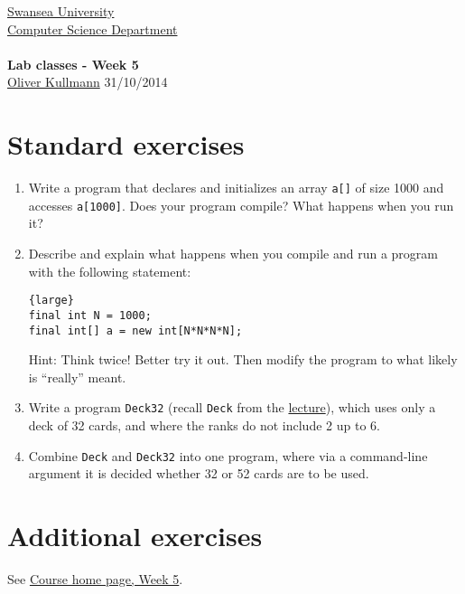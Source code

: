 \documentclass[11pt]{article}
\newcommand{\Java}{\lstset{language=Java,keywordstyle=\bfseries,breaklines,breakindent=30pt}}
\begin{document}
\begin{center}
  \href{http://www.swan.ac.uk/}{Swansea University}\\
  \href{http://www.swan.ac.uk/compsci/}{Computer Science Department}\\[1ex]
  \href{\chp}{\module}\\[1ex]
  \textbf{Lab classes - Week 5}\\
  \href{http://cs.swan.ac.uk/~csoliver}{Oliver Kullmann} 31/10/2014
\end{center}

\section{Standard exercises}
\label{sec:stdex}

\Java

\begin{enumerate}
\item Write a program that declares and initializes an array \texttt{a[]} of size 1000 and accesses \texttt{a[1000]}. Does your program compile? What happens when you run it?
\item Describe and explain what happens when you compile and run a program with the following statement:
  \begin{lstlisting}{large}
final int N = 1000;
final int[] a = new int[N*N*N*N];
  \end{lstlisting}
  Hint: Think twice! Better try it out. Then modify the program to what likely is ``really'' meant.
\item Write a program \texttt{Deck32} (recall \texttt{Deck} from the \href{http://cs.swan.ac.uk/~csoliver/ProgrammingJava201415_MgQxuCUrrS/index.html#LecturesWeek05}{lecture}), which uses only a deck of 32 cards, and where the ranks do not include 2 up to 6.
\item Combine \texttt{Deck} and \texttt{Deck32} into one program, where via a command-line argument it is decided whether 32 or 52 cards are to be used.
\end{enumerate}


\section{Additional exercises}
\label{sec:addex}

See \href{\chp#ExercisesWeek05}{Course home page, Week 5}.
\end{document}
